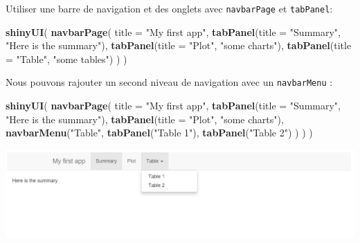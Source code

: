 \documentclass[
]{article}
\newenvironment{Shaded}{\begin{snugshade}}{\end{snugshade}}
\newcommand{\AttributeTok}[1]{\textcolor[rgb]{0.13,0.29,0.53}{#1}}
\newcommand{\FunctionTok}[1]{\textcolor[rgb]{0.13,0.29,0.53}{\textbf{#1}}}
\newcommand{\NormalTok}[1]{#1}
\newcommand{\StringTok}[1]{\textcolor[rgb]{0.31,0.60,0.02}{#1}}
\begin{document}
Utiliser une barre de navigation et des onglets avec \texttt{navbarPage}
et \texttt{tabPanel}:

\begin{Shaded}
\begin{Highlighting}[]
\FunctionTok{shinyUI}\NormalTok{(}
  \FunctionTok{navbarPage}\NormalTok{(}
    \AttributeTok{title =} \StringTok{"My first app"}\NormalTok{,}
    \FunctionTok{tabPanel}\NormalTok{(}\AttributeTok{title =} \StringTok{"Summary"}\NormalTok{,}
             \StringTok{"Here is the summary"}\NormalTok{),}
    \FunctionTok{tabPanel}\NormalTok{(}\AttributeTok{title =} \StringTok{"Plot"}\NormalTok{,}
             \StringTok{"some charts"}\NormalTok{),}
    \FunctionTok{tabPanel}\NormalTok{(}\AttributeTok{title =} \StringTok{"Table"}\NormalTok{,}
             \StringTok{"some tables"}\NormalTok{)}
\NormalTok{  )}
\NormalTok{)}
\end{Highlighting}
\end{Shaded}

Nous pouvons rajouter un second niveau de navigation avec un
\texttt{navbarMenu} :

\begin{Shaded}
\begin{Highlighting}[]
\FunctionTok{shinyUI}\NormalTok{(}
  \FunctionTok{navbarPage}\NormalTok{(}
    \AttributeTok{title =} \StringTok{"My first app"}\NormalTok{,}
    \FunctionTok{tabPanel}\NormalTok{(}\AttributeTok{title =} \StringTok{"Summary"}\NormalTok{,}
             \StringTok{"Here is the summary"}\NormalTok{),}
    \FunctionTok{tabPanel}\NormalTok{(}\AttributeTok{title =} \StringTok{"Plot"}\NormalTok{,}
             \StringTok{"some charts"}\NormalTok{),}
    \FunctionTok{navbarMenu}\NormalTok{(}\StringTok{"Table"}\NormalTok{,}
               \FunctionTok{tabPanel}\NormalTok{(}\StringTok{"Table 1"}\NormalTok{),}
               \FunctionTok{tabPanel}\NormalTok{(}\StringTok{"Table 2"}\NormalTok{)}
\NormalTok{    )}
\NormalTok{  )}
\NormalTok{)}
\end{Highlighting}
\end{Shaded}

\includegraphics{img/navbar.png}
\end{document}
